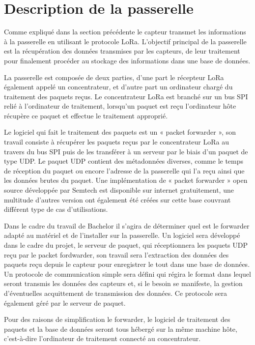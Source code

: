\chapter{Description de la passerelle}

Comme expliqué dans la section précédente le capteur transmet les informations à la passerelle en utilisant le protocole LoRa. L’objectif principal de la passerelle est la récupération des données transmises par les capteurs, de leur traitement pour finalement procéder au stockage des informations dans une base de données.

La passerelle est composée de deux parties, d’une part le récepteur LoRa également appelé un concentrateur, et d’autre part un ordinateur chargé du traitement des paquets reçus. Le concentrateur LoRa est branché sur un bus SPI relié à l’ordinateur de traitement, lorsqu’un paquet est reçu l’ordinateur hôte récupère ce paquet et effectue le traitement approprié. 

Le logiciel qui fait le traitement des paquets est un « packet forwarder », son travail consiste à récupérer les paquets reçus par le concentrateur LoRa au travers du bus SPI puis de les transférer à un serveur par le biais d’un paquet de type UDP. Le paquet UDP contient des métadonnées diverses, comme le temps de réception du paquet ou encore l’adresse de la passerelle qui l’a reçu ainsi que les données brutes du paquet. Une implémentation de « packet forwarder » open source développée par Semtech est disponible sur internet gratuitement, une multitude d’autres version ont également été créées sur cette base couvrant différent type de cas d’utilisations.

Dans le cadre du travail de Bachelor il s’agira de déterminer quel est le forwarder adapté au matériel et de l’installer sur la passerelle. Un logiciel sera développé dans le cadre du projet, le serveur de paquet, qui réceptionnera les paquets UDP reçu par le packet fordwarder, son travail sera l’extraction des données des paquets reçu depuis le capteur pour enregistrer le tout dans une base de données. Un protocole de communication simple sera défini qui régira le format dans lequel seront transmis les données des capteurs et, si le besoin se manifeste, la gestion d’éventuelles acquittement de transmission des données. Ce protocole sera également géré par le serveur de paquet.

Pour des raisons de simplification le forwarder, le logiciel de traitement des paquets et la base de données seront tous hébergé sur la même machine hôte, c’est-à-dire l’ordinateur de traitement connecté au concentrateur.

